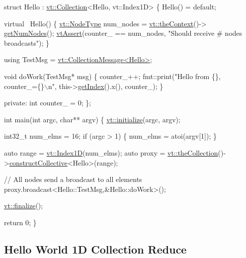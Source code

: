 \begin{DoxyCodeInclude}
\textcolor{keyword}{struct }Hello : \hyperlink{structvt_1_1vrt_1_1collection_1_1_collection}{vt::Collection}<Hello, vt::Index1D> \{
  Hello() = \textcolor{keywordflow}{default};

  \textcolor{keyword}{virtual} ~Hello() \{
    \hyperlink{namespacevt_a866da9d0efc19c0a1ce79e9e492f47e2}{vt::NodeType} num\_nodes = \hyperlink{namespacevt_a26551fe0e6e6a1371111df5b12c7e92c}{vt::theContext}()->
      \hyperlink{structvt_1_1ctx_1_1_context_a7f41071aadf6d5fa9e1b6c703c5ff19d}{getNumNodes}();
    \hyperlink{config__assert_8h_aeddd4990a496e91a0ca5d6c16437359b}{vtAssert}(counter\_ == num\_nodes, \textcolor{stringliteral}{"Should receive # nodes broadcasts"});
  \}

  \textcolor{keyword}{using} TestMsg = \hyperlink{structvt_1_1vrt_1_1collection_1_1_collection_message}{vt::CollectionMessage<Hello>};

  \textcolor{keywordtype}{void} doWork(TestMsg* msg) \{
    counter\_++;
    fmt::print(\textcolor{stringliteral}{"Hello from \{\}, counter\_=\{\}\(\backslash\)n"}, this->\hyperlink{structvt_1_1vrt_1_1collection_1_1_indexable_a28d05f23e7a20e12e94b8235305c1e82}{getIndex}().x(), counter\_);
  \}

\textcolor{keyword}{private}:
  \textcolor{keywordtype}{int} counter\_ = 0;
\};

\textcolor{keywordtype}{int} main(\textcolor{keywordtype}{int} argc, \textcolor{keywordtype}{char}** argv) \{
  \hyperlink{namespacevt_aaa266774ea8339c58be0202b00fafa62}{vt::initialize}(argc, argv);

  int32\_t num\_elms = 16;
  \textcolor{keywordflow}{if} (argc > 1) \{
    num\_elms = atoi(argv[1]);
  \}

  \textcolor{keyword}{auto} range = \hyperlink{namespacevt_a5540efc78234273e1796fb003fe4d234}{vt::Index1D}(num\_elms);
  \textcolor{keyword}{auto} proxy = \hyperlink{namespacevt_a1c45ce63bfd2c327ff7d76a319a371d8}{vt::theCollection}()->\hyperlink{structvt_1_1vrt_1_1collection_1_1_collection_manager_aa2531212565b2c6f85fa3b55d278bbba}{constructCollective}<Hello>(range);

  \textcolor{comment}{// All nodes send a broadcast to all elements}
  proxy.broadcast<Hello::TestMsg,&Hello::doWork>();

  \hyperlink{namespacevt_a540d90dbd6e97b69f1dcbc9ee9314cff}{vt::finalize}();

  \textcolor{keywordflow}{return} 0;
\}
\end{DoxyCodeInclude}
 \hypertarget{collection_reduce-hello-world-collection}{}\subsection{Hello World 1\+D Collection Reduce}\label{collection_reduce-hello-world-collection}

